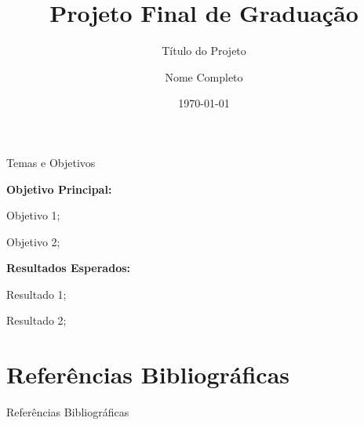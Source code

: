 \documentclass[handout,10pt,aspectratio=169]{beamer}
\title[Todos os direitos reservados]
{     
     \textbf{Projeto Final de Graduação}
}
\subtitle[]
{
    Título do Projeto
}
\author{Nome Completo}
\institute{Universidade Federal do Rio de Janeiro}
\date{\today}
\begin{document}
\maketitle

\begin{slide}{Temas e Objetivos}

	\begin{objectiveBox}[\linewidth]
	\justifying
    	\textbf{Objetivo Principal:}
    	\begin{Item}
    	    \item Objetivo 1;
    	    \item Objetivo 2; 
        \end{Item}
	\end{objectiveBox}
	
    \begin{objectiveBox}[\linewidth]
    \justifying
    \textbf{Resultados Esperados:} 
        \begin{Item}
    	    \item Resultado 1;
    	    \item Resultado 2;
        \end{Item}
    \end{objectiveBox}	
	
\end{slide}


    	
    	
    	
    	
    	


\section{Referências Bibliográficas}
\label{sec:referencias}
\begin{slide}{Referências Bibliográficas}
%

\scriptsize
\end{slide}
\end{document}
